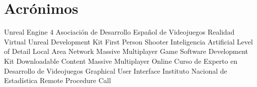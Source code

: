 \section*{Acrónimos}

{\small
\begin{acronym}[XXXXXXXX]
  	 {Unreal Engine 4}
  	 {Asociación de Desarrollo Español de Videojuegos}
  		 {Realidad Virtual}
   	 {Unreal Development Kit}
  	 {First Person Shooter}
  		 {Inteligencia Artificial}
  	 {Level of Detail}
  	 {Local Area Network}
  	 {Massive Multiplayer Game}
       {Software Development Kit}
  	 {Downloadable Content}
  	 {Massive Multiplayer Online}
  	 {Curso de Experto en Desarrollo de Videojuegos}
  	 {Graphical User Interface}
  	 {Instituto Nacional de Estadística}
  	 {Remote Procedure Call}
\end{acronym}
}
